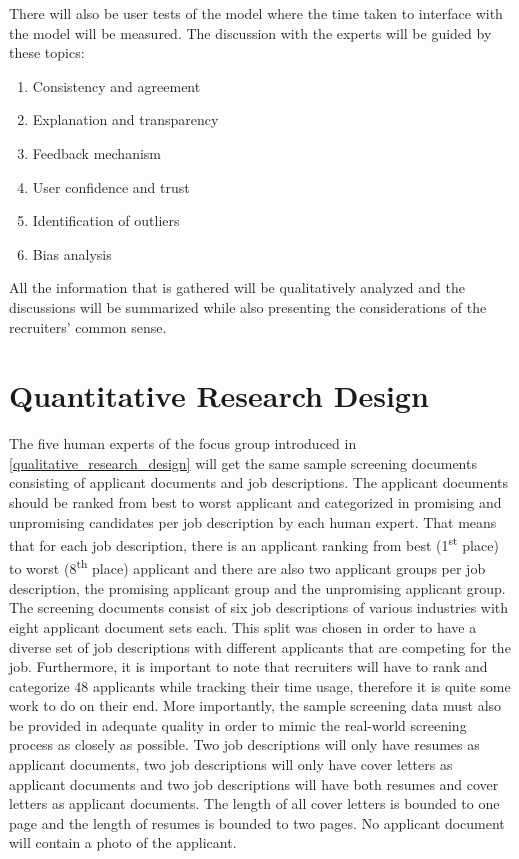 \documentclass[draft,final]{thesisclass} %
\begin{document}
\begin{enumerate}
    There will also be user tests of the model where the time taken to interface with the model will be measured.
    The discussion with the experts will be guided by these topics:
    \begin{enumerate}
        \item Consistency and agreement
        \item Explanation and transparency
        \item Feedback mechanism
        \item User confidence and trust
        \item Identification of outliers
        \item Bias analysis
    \end{enumerate}
\end{enumerate}
All the information that is gathered will be qualitatively analyzed and the discussions will be summarized while also presenting the considerations of the recruiters' common sense.

\section{Quantitative Research Design} \label{quantitative_research_design}
The five human experts of the focus group introduced in \ref{qualitative_research_design} will get the same sample screening documents consisting of applicant documents and job descriptions.
The applicant documents should be ranked from best to worst applicant and categorized in promising and unpromising candidates per job description by each human expert.
That means that for each job description, there is an applicant ranking from best (1\textsuperscript{st} place) to worst (8\textsuperscript{th} place) applicant and there are also two applicant groups per job description, the promising applicant group and the unpromising applicant group.
The screening documents consist of six job descriptions of various industries with eight applicant document sets each.
This split was chosen in order to have a diverse set of job descriptions with different applicants that are competing for the job.
Furthermore, it is important to note that recruiters will have to rank and categorize $48$ applicants while tracking their time usage, therefore it is quite some work to do on their end.
More importantly, the sample screening data must also be provided in adequate quality in order to mimic the real-world screening process as closely as possible.
Two job descriptions will only have resumes as applicant documents, two job descriptions will only have cover letters as applicant documents and two job descriptions will have both resumes and cover letters as applicant documents.
The length of all cover letters is bounded to one page and the length of resumes is bounded to two pages.
No applicant document will contain a photo of the applicant.
\end{document}
